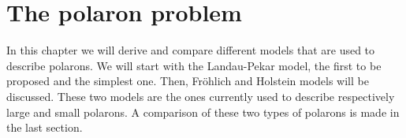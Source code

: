 \chapter{The polaron problem} \label{ch:polarons}

In this chapter we will derive and compare different models that are used to describe polarons. We will start with the Landau-Pekar model, the first to be proposed and the simplest one. Then, Fröhlich and Holstein models will be discussed. These two models are the ones currently used to describe respectively large and small polarons. A comparison of these two types of polarons is made in the last section.




